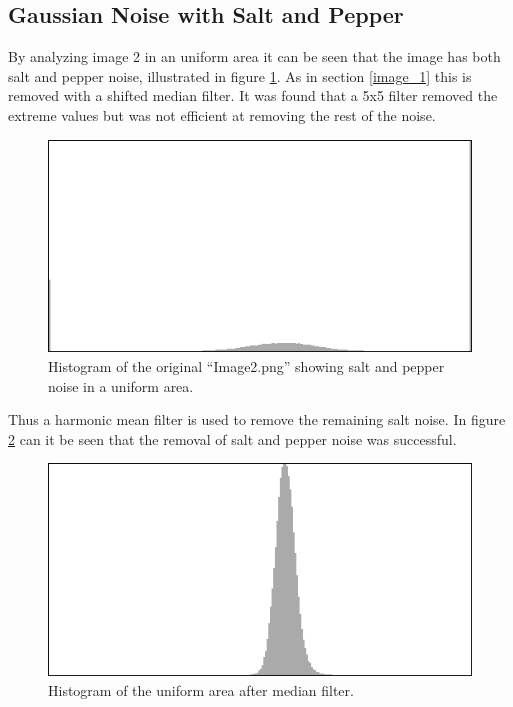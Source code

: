\subsection{Gaussian Noise with Salt and Pepper}

By analyzing image 2 in an uniform area it can be seen that the image has both salt and pepper noise, illustrated in figure \ref{fig:hist2_uniform}.
As in section \ref{image_1} this is removed with a shifted median filter. 
It was found that a 5x5 filter removed the extreme values but was not efficient at removing the rest of the noise.

\begin{figure}[H]
\centering
\includegraphics[width = 0.8 \linewidth]{graphics/hist2_uniform.png}
\caption{Histogram of the original ``Image2.png'' showing salt and pepper noise in a uniform area.}
\label{fig:hist2_uniform}
\end{figure}

Thus a harmonic mean filter is used to remove the remaining salt noise.
In figure \ref{fig:hist2_median} can it be seen that the removal of salt and pepper noise was successful.

\begin{figure}[H]
\centering
\includegraphics[width = 0.8 \linewidth]{graphics/hist2_after_median.png}
\caption{Histogram of the uniform area after median filter.}
\label{fig:hist2_median}
\end{figure}

